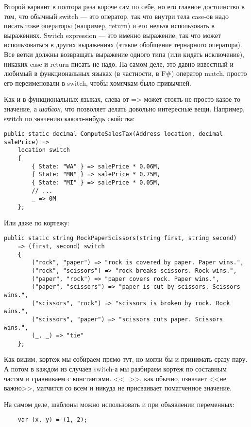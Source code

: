 \documentclass[a5paper]{article}
\begin{document}
Второй вариант в полтора раза короче сам по себе, но его главное достоинство в том, что обычный switch --- это оператор, так что внутри тела case-ов надо писать тоже операторы (например, return) и его нельзя использовать в выражениях. Switch expression --- это именно выражение, так что может использоваться в других выражениях (этакое обобщение тернарного оператора). Все ветки должны возвращать выражение одного типа (или кидать исключение), никаких case и return писать не надо. На самом деле, это давно известный и любимый в функциональных языках (в частности, в F\#) оператор match, просто его переименовали в switch, чтобы хомячкам было привычней.

Как и в функциональных языках, слева от => может стоять не просто какое-то значение, а \textit{шаблон}, что позволяет делать довольно интересные вещи. Например, switch по значению какого-нибудь свойства:

\begin{verbatim}
public static decimal ComputeSalesTax(Address location, decimal salePrice) =>
    location switch
    {
        { State: "WA" } => salePrice * 0.06M,
        { State: "MN" } => salePrice * 0.75M,
        { State: "MI" } => salePrice * 0.05M,
        // ...
        _ => 0M
    };
\end{verbatim}

Или даже по кортежу:

\begin{verbatim}
public static string RockPaperScissors(string first, string second)
    => (first, second) switch
    {
        ("rock", "paper") => "rock is covered by paper. Paper wins.",
        ("rock", "scissors") => "rock breaks scissors. Rock wins.",
        ("paper", "rock") => "paper covers rock. Paper wins.",
        ("paper", "scissors") => "paper is cut by scissors. Scissors wins.",
        ("scissors", "rock") => "scissors is broken by rock. Rock wins.",
        ("scissors", "paper") => "scissors cuts paper. Scissors wins.",
        (_, _) => "tie"
    };
\end{verbatim}

Как видим, кортеж мы собираем прямо тут, но могли бы и принимать сразу пару. А потом в каждом из случаев switch-а мы разбираем кортеж по составным частям и сравниваем с константами. <<\_>>, как обычно, означает <<не важно>>, матчится со всем и никуда не присваивает поматченное значение.

На самом деле, шаблоны можно использовать и при объявлении переменных:

\begin{verbatim}
    var (x, y) = (1, 2);
\end{verbatim}
\end{document}
